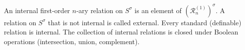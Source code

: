 An internal first-order $n$-ary relation on $S^\sigma$ is an element of $(\mathcal{R}_n^{(1)})^\sigma$. A relation on $S^\sigma$ that is not internal is called external. Every standard (definable) relation is internal. The collection of internal relations is closed under Boolean operations (intersection, union, complement).
